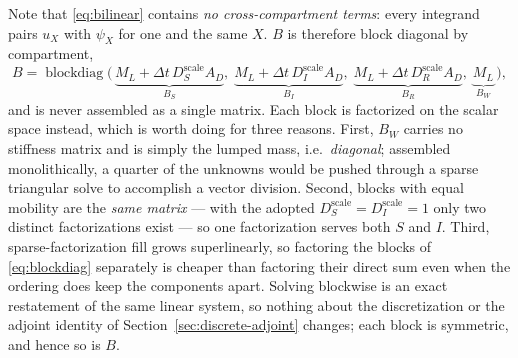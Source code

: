 \documentclass[11pt]{article}
\begin{document}
Note that \eqref{eq:bilinear} contains \emph{no cross-compartment terms}: every integrand pairs $u_X$ with $\psi_X$ for one and the same $X$. $B$ is therefore block diagonal by compartment,
\begin{equation}
B = \operatorname{blockdiag}\big(\,\underbrace{M_L + \Delta t\,D_S^{\text{scale}}A_D}_{B_S},\;\underbrace{M_L + \Delta t\,D_I^{\text{scale}}A_D}_{B_I},\;\underbrace{M_L + \Delta t\,D_R^{\text{scale}}A_D}_{B_R},\;\underbrace{M_L}_{B_W}\,\big),
\label{eq:blockdiag}
\end{equation}
and is never assembled as a single matrix. Each block is factorized on the scalar space instead, which is worth doing for three reasons. First, $B_W$ carries no stiffness matrix and is simply the lumped mass, i.e.\ \emph{diagonal}; assembled monolithically, a quarter of the unknowns would be pushed through a sparse triangular solve to accomplish a vector division. Second, blocks with equal mobility are the \emph{same matrix} --- with the adopted $D_S^{\text{scale}} = D_I^{\text{scale}} = 1$ only two distinct factorizations exist --- so one factorization serves both $S$ and $I$. Third, sparse-factorization fill grows superlinearly, so factoring the blocks of \eqref{eq:blockdiag} separately is cheaper than factoring their direct sum even when the ordering does keep the components apart. Solving blockwise is an exact restatement of the same linear system, so nothing about the discretization or the adjoint identity of Section~\ref{sec:discrete-adjoint} changes; each block is symmetric, and hence so is $B$.
\end{document}
